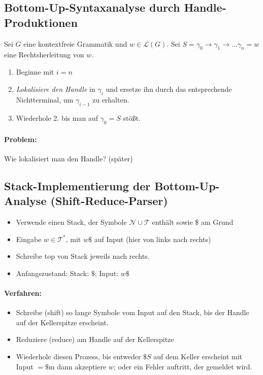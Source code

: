 \subsection{Bottom-Up-Syntaxanalyse durch Handle-Produktionen}
Sei $G$ eine kontextfreie Grammatik und $w \in \mathcal{L}(G)$. Sei $S = \gamma_0 \to \gamma_1 \to ... \gamma_n = w$ eine Rechtsherleitung von $w$.
\begin{enumerate}
 \item Beginne mit $i = n$
 \item \emph{Lokalisiere den Handle} in $\gamma_i$ und ersetze ihn durch das entsprechende Nichtterminal, um $\gamma_{i-1}$ zu erhalten.
 \item Wiederhole 2. bis man auf $\gamma_0 = S$ stößt.
\end{enumerate}
\paragraph*{Problem:} Wie lokalisiert man den Handle? (später)\\

\subsection{Stack-Implementierung der Bottom-Up-Analyse (Shift-Reduce-Parser)}
\begin{itemize}
 \item Verwende einen Stack, der Symbole $\mathcal{N} \cup \mathcal{T}$ enthält sowie \$ am Grund
 \item Eingabe $w \in \mathcal{T}^*$, mit $w\$$ auf Input (hier von links nach rechts)
 \item Schreibe top von Stack jeweils nach rechts.
 \item Anfangszustand: Stack: $\$$; Input: $w\$$
\end{itemize}

\paragraph*{Verfahren:}
\begin{itemize}
 \item Schreibe (shift) so lange Symbole vom Input auf den Stack, bis der Handle auf der Kellerspitze erscheint.
 \item Reduziere (reduce) am Handle auf der Kellerspitze
 \item Wiederhole diesen Prozess, bis entweder $\$S$ auf dem Keller erscheint mit Input $= \$$m dann akzeptiere $w$; oder ein Fehler auftritt, der gemeldet wird.
\end{itemize}

